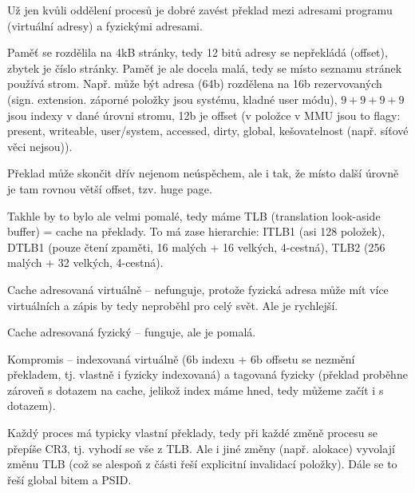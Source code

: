 \documentclass[12pt]{article}                   %
\begin{document}
        \begin{definice}
            Už jen kvůli oddělení procesů je dobré zavést překlad mezi adresami programu (virtuální adresy) a fyzickými adresami.

            Paměť se rozdělila na 4kB stránky, tedy 12 bitů adresy se nepřekládá (offset), zbytek je číslo stránky. Paměť je ale docela malá, tedy se místo seznamu stránek používá strom. Např. může být adresa (64b) rozdělena na 16b rezervovaných (sign. extension. záporné položky jsou systému, kladné user módu), $9+9+9+9$ jsou indexy v dané úrovni stromu, 12b je offset (v položce v MMU jsou to flagy: present, writeable, user/system, accessed, dirty, global, kešovatelnost (např. síťové věci nejsou)).

            Překlad může skončit dřív nejenom neúspěchem, ale i tak, že místo další úrovně je tam rovnou větší offset, tzv. huge page.

            Takhle by to bylo ale velmi pomalé, tedy máme TLB (translation look-aside buffer) = cache na překlady. To má zase hierarchie: ITLB1 (asi 128 položek), DTLB1 (pouze čtení zpaměti, 16 malých + 16 velkých, 4-cestná), TLB2 (256 malých + 32 velkých, 4-cestná).
        \end{definice}

        \begin{poznamka}
            Cache adresovaná virtuálně -- nefunguje, protože fyzická adresa může mít více virtuálních a zápis by tedy neproběhl pro celý svět. Ale je rychlejší.

            Cache adresovaná fyzický -- funguje, ale je pomalá.

            Kompromis -- indexovaná virtuálně (6b indexu + 6b offsetu se nezmění překladem, tj. vlastně i fyzicky indexovaná) a tagovaná fyzicky (překlad proběhne zároveň s dotazem na cache, jelikož index máme hned, tedy můžeme začít i s dotazem).
        \end{poznamka}


        \begin{definice}
            Každý proces má typicky vlastní překlady, tedy při každé změně procesu se přepíše CR3, tj. vyhodí se vše z TLB. Ale i jiné změny (např. alokace) vyvolají změnu TLB (což se alespoň z části řeší explicitní invalidací položky). Dále se to řeší global bitem a PSID.
        \end{definice}
\end{document}
